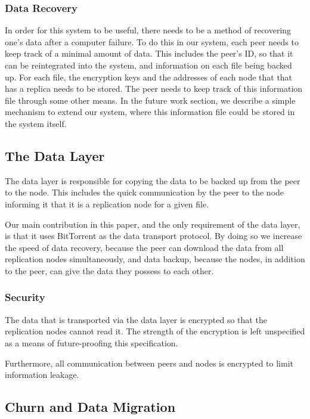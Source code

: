 \documentclass[12pt]{report}
\begin{document}
\subsubsection{Data Recovery}
\label{subsubsec:DataRecovery_sec:DataExchange_chap:BTBackup}
In order for this system to be useful, there needs to be a method of recovering one's data after a computer failure. To do this in our system, each peer needs to keep track of a minimal amount of data. This includes the peer's ID, so that it can be reintegrated into the system, and information on each file being backed up. For each file, the encryption keys and the addresses of each node that that has a replica needs to be stored. The peer needs to keep track of this information file through some other means. In the future work section, we describe a simple mechanism to extend our system, where this information file could be stored in the system itself.

\subsection{The Data Layer} \label{subsec:TheDataLayer}

The data layer is responsible for copying the data to be backed up from the peer to the node. This includes the quick communication by the peer to the node informing it that it is a replication node for a given file.

Our main contribution in this paper, and the only requirement of the data layer, is that it uses BitTorrent as the data transport protocol. By doing so we increase the speed of data recovery, because the peer can download the data from all replication nodes simultaneously, and data backup, because the nodes, in addition to the peer, can give the data they possess to each other.

\subsubsection{Security}

The data that is transported via the data layer is encrypted so that the replication nodes cannot read it. The strength of the encryption is left unspecified as a means of future-proofing this specification.

Furthermore, all communication between peers and nodes is encrypted to limit information leakage.

\subsection{Churn and Data Migration} \label{sec:ChurnandDataMigration_DataExchange}
\end{document}
